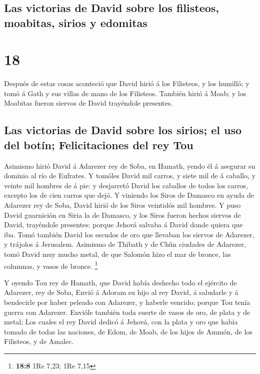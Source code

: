 \hypertarget{las-victorias-de-david-sobre-los-filisteos-moabitas-sirios-y-edomitas}{%
\subsection{Las victorias de David sobre los filisteos, moabitas, sirios
y
edomitas}\label{las-victorias-de-david-sobre-los-filisteos-moabitas-sirios-y-edomitas}}

\hypertarget{section-17}{%
\section{18}\label{section-17}}

 Después de estas cosas aconteció que David hirió á los
Filisteos, y los humilló; y tomó á Gath y sus villas de mano de los
Filisteos.  También hirió á Moab; y los Moabitas fueron
siervos de David trayéndole presentes.

\hypertarget{las-victorias-de-david-sobre-los-sirios-el-uso-del-botuxedn-felicitaciones-del-rey-tou}{%
\subsection{Las victorias de David sobre los sirios; el uso del botín;
Felicitaciones del rey
Tou}\label{las-victorias-de-david-sobre-los-sirios-el-uso-del-botuxedn-felicitaciones-del-rey-tou}}

 Asimismo hirió David á Adarezer rey de Soba, en Hamath,
yendo él á asegurar su dominio al río de Eufrates.  Y
tomóles David mil carros, y siete mil de á caballo, y veinte mil hombres
de á pie: y desjarretó David los caballos de todos los carros, excepto
los de cien carros que dejó.  Y viniendo los Siros de
Damasco en ayuda de Adarezer rey de Soba, David hirió de los Siros
veintidós mil hombres.  Y puso David guarnición en Siria la
de Damasco, y los Siros fueron hechos siervos de David, trayéndole
presentes: porque Jehová salvaba á David donde quiera que iba.
 Tomó también David los escudos de oro que llevaban los
siervos de Adarezer, y trájolos á Jerusalem.  Asimismo de
Thibath y de Chûn ciudades de Adarezer, tomó David muy mucho metal, de
que Salomón hizo el mar de bronce, las columnas, y vasos de bronce.
\footnote{\textbf{18:8} 1Re 7,23; 1Re 7,15}

 Y oyendo Tou rey de Hamath, que David había deshecho todo
el ejército de Adarezer, rey de Soba,  Envió á Adoram su
hijo al rey David, á saludarle y á bendecirle por haber peleado con
Adarezer, y haberle vencido; porque Tou tenía guerra con Adarezer.
Envióle también toda suerte de vasos de oro, de plata y de metal;
 Los cuales el rey David dedicó á Jehová, con la plata y
oro que había tomado de todas las naciones, de Edom, de Moab, de los
hijos de Ammón, de los Filisteos, y de Amalec.

